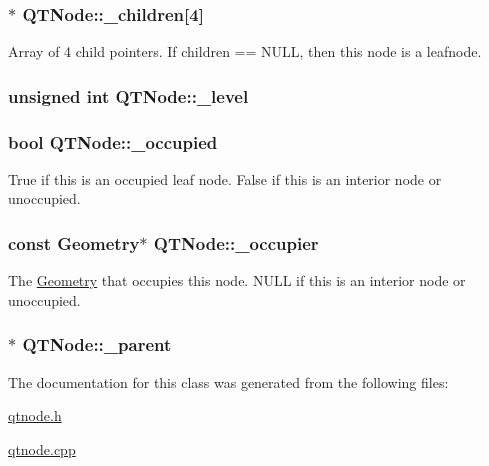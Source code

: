 \hypertarget{class_q_t_node_ab908d2ab924e7e53f2a1d0d8373833d2}{
\subsubsection[{\+\_\+children}]{$\ast$ Q\+T\+Node\+::\+\_\+children\mbox{[}4\mbox{]}}}\label{class_q_t_node_ab908d2ab924e7e53f2a1d0d8373833d2}
Array of 4 child pointers. If children == N\+U\+L\+L, then this node is a leafnode. \hypertarget{class_q_t_node_a80d41a086f3020f670732d0c7971afb0}{
\subsubsection[{\+\_\+level}]{\setlength{\rightskip}{0pt plus 5cm}unsigned int Q\+T\+Node\+::\+\_\+level}}\label{class_q_t_node_a80d41a086f3020f670732d0c7971afb0}
\hypertarget{class_q_t_node_ae8721982666788f10f11d4545a77bf61}{
\subsubsection[{\+\_\+occupied}]{\setlength{\rightskip}{0pt plus 5cm}bool Q\+T\+Node\+::\+\_\+occupied}}\label{class_q_t_node_ae8721982666788f10f11d4545a77bf61}
True if this is an occupied leaf node. False if this is an interior node or unoccupied. \hypertarget{class_q_t_node_aa61ac86e1264835162e6101d70b7883e}{
\subsubsection[{\+\_\+occupier}]{\setlength{\rightskip}{0pt plus 5cm}const {\bf Geometry}$\ast$ Q\+T\+Node\+::\+\_\+occupier}}\label{class_q_t_node_aa61ac86e1264835162e6101d70b7883e}
The \hyperlink{class_geometry}{Geometry} that occupies this node. N\+U\+L\+L if this is an interior node or unoccupied. \hypertarget{class_q_t_node_a47f01353c3e4f66ab1006a7dbc2be797}{
\subsubsection[{\+\_\+parent}]{$\ast$ Q\+T\+Node\+::\+\_\+parent}}\label{class_q_t_node_a47f01353c3e4f66ab1006a7dbc2be797}


The documentation for this class was generated from the following files\+:\begin{DoxyCompactItemize}
\item 
\hyperlink{qtnode_8h}{qtnode.\+h}\item 
\hyperlink{qtnode_8cpp}{qtnode.\+cpp}\end{DoxyCompactItemize}
